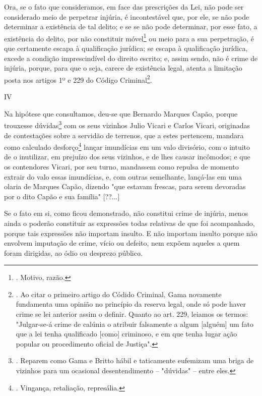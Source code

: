 Ora, se o fato que consideramos, em face das prescrições da Lei, não
pode ser considerado meio de perpetrar injúria, é incontestável que, por
ele, se não pode determinar a existência de tal delito; e se se não pode
determinar, por esse fato, a existência do delito, por não constituir
móvel\footnote{. Motivo, razão.} ou meio para a sua perpetração, é que
certamente escapa à qualificação jurídica; se escapa à qualificação
jurídica, excede a condição imprescindível do direito escrito; e, assim
sendo, não é crime de injúria, porque, para que o seja, carece de
existência legal, atenta a limitação posta nos artigos 1º e 229 do
Código Criminal\footnote{. Ao citar o primeiro artigo do Códido
  Criminal, Gama novamente fundamenta uma opinião no princípio da
  reserva legal, onde só pode haver crime se lei anterior assim o
  definir. Quanto ao art. 229, leiamos os termos: "Julgar-se-á crime de
  calúnia o atribuir falsamente a algum {[}alguém{]} um fato que a lei
  tenha qualificado {[}como{]} criminoso, e em que tenha lugar ação
  popular ou procedimento oficial de Justiça".}.

IV

Na hipótese que consultamos, deu-se que Bernardo Marques Capão, porque
trouxesse dúvidas\footnote{. Reparem como Gama e Britto hábil e
  taticamente eufemizam uma briga de vizinhos para um ocasional
  desentendimento -- "dúvidas" -- entre eles.} com os seus vizinhos
Julio Vicari e Carlos Vicari, originadas de contestações sobre a
servidão de terrenos, que a estes pertencem, mandara como calculado
desforço\footnote{. Vingança, retaliação, represália.} lançar imundícias
em um valo divisório, com o intuito de o inutilizar, em prejuízo dos
seus vizinhos, e de lhes causar incômodos; e que os contendores Vicari,
por seu turno, mandassem como repulsa de momento extrair do valo essas
imundícias, e, com outras semelhante, lançá-las em uma olaria de Marques
Capão, dizendo "que estavam frescas, para serem devoradas por o dito
Capão e sua família" {[}??...{]}

Se o fato em si, como ficou demonstrado, não constitui crime de injúria,
menos ainda o poderão constituir as expressões todas relativas de que
foi acompanhado, porque tais expressões não importam insulto. E não
importam insulto porque não envolvem imputação de crime, vício ou
defeito, nem expõem aqueles a quem foram dirigidas, ao ódio ou desprezo
público.

